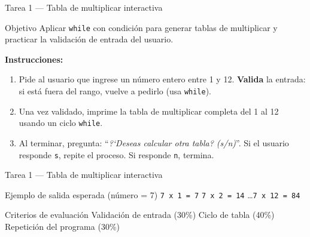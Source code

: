 \documentclass[aspectratio=169,xcolor=dvipsnames]{beamer}
\begin{document}
\begin{frame}{Tarea 1 --- Tabla de multiplicar interactiva}
    \begin{block}{Objetivo}
        Aplicar \texttt{while} con condici\'on para generar tablas de multiplicar y
        practicar la validaci\'on de entrada del usuario.
    \end{block}

    \vspace{0.2cm}
    \textbf{Instrucciones:}
    \begin{enumerate}
        \item Pide al usuario que ingrese un n\'umero entero entre 1 y 12.
              \textbf{Valida} la entrada: si est\'a fuera del rango, vuelve a pedirlo (usa \texttt{while}).
        \item Una vez validado, imprime la tabla de multiplicar completa del 1 al 12
              usando un ciclo \texttt{while}.
        \item Al terminar, pregunta: ``\textit{?`Deseas calcular otra tabla? (s/n)}''.
              Si el usuario responde \texttt{s}, repite el proceso. Si responde \texttt{n}, termina.
    \end{enumerate}
\end{frame}

\begin{frame}{Tarea 1 --- Tabla de multiplicar interactiva}

    \vspace{0.2cm}
    \begin{exampleblock}{Ejemplo de salida esperada (n\'umero = 7)}
        \texttt{7 x 1 = 7} \quad \texttt{7 x 2 = 14} \quad \ldots \quad \texttt{7 x 12 = 84}
    \end{exampleblock}

    \begin{alertblock}{Criterios de evaluaci\'on}
        Validaci\'on de entrada (30\%) \quad Ciclo de tabla (40\%) \quad Repetici\'on del programa (30\%)
    \end{alertblock}
\end{frame}
\end{document}
